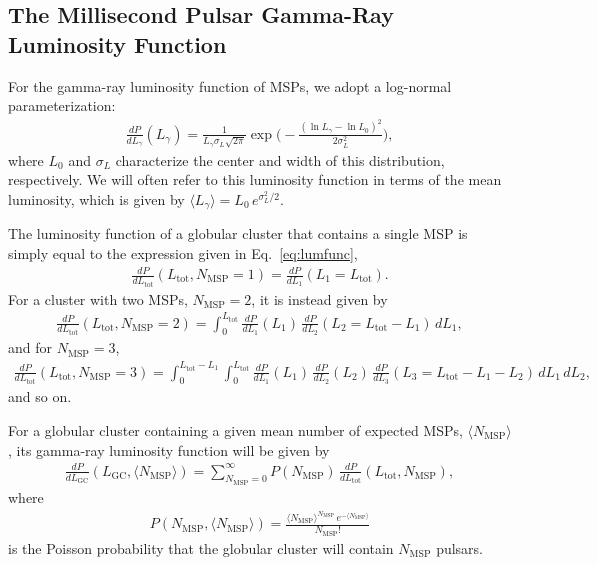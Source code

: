 \subsection{The Millisecond Pulsar Gamma-Ray Luminosity Function}
\label{sec:glf}

For the gamma-ray luminosity function of MSPs, we adopt a log-normal parameterization:
%
\begin{align}
\frac{dP}{dL_{\gamma}}(L_{\gamma}) = \frac{1}{L_{\gamma} \sigma_L \sqrt{2\pi}} \exp\bigg(-\frac{(\ln L_{\gamma} - \ln L_0)^2}{2 \sigma_L^2}\bigg),
\label{eq:lumfunc}
\end{align}
%
where $L_0$ and $\sigma_L$ characterize the center and width of this distribution, respectively. We will often refer to this luminosity function in terms of the mean luminosity, which is given by $\langle L_{\gamma} \rangle = L_0 \, e^{\sigma_L^2/2}$.

The luminosity function of a globular cluster that contains a single MSP is simply equal to the expression given in Eq.~\ref{eq:lumfunc},
%
\begin{align}
\frac{dP}{dL_\textrm{tot}} (L_\textrm{tot}, N_\textrm{MSP}=1) = \frac{dP}{dL_{1}}(L_1=L_\textrm{tot}). 
\end{align}
%
For a cluster with two MSPs, $N_\textrm{MSP}=2$, it is instead given by
%
\begin{align}
\frac{dP}{dL_\textrm{tot}}(L_\textrm{tot}, N_\textrm{MSP}=2) =  \int_0^{L_\textrm{tot}} \frac{dP}{dL_1}(L_1) \, \frac{dP}{dL_2}(L_2=L_\textrm{tot}-L_1) \, dL_1,
\end{align}
%
and for $N_\textrm{MSP}=3$,
%
\begin{align}
\frac{dP}{dL_\textrm{tot}}(L_\textrm{tot}, N_\textrm{MSP}=3)  = \int_0^{L_\textrm{tot}-L_1} \int_0^{L_\textrm{tot}} \frac{dP}{dL_1}(L_1) \, \frac{dP}{dL_2}(L_2) \,\frac{dP}{dL_3}(L_3=L_\textrm{tot}-L_1-L_2) \, dL_1 \, dL_2,
\end{align}
%
and so on.

For a globular cluster containing a given mean number of expected MSPs, $\langle N_\textrm{MSP}\rangle$, its gamma-ray luminosity function will be given by
%
\begin{align}
\frac{dP}{dL_\textrm{GC}}(L_\textrm{GC},\langle N_\textrm{MSP}\rangle)  = \sum_{N_\textrm{MSP}=0}^\infty P(N_\textrm{MSP}) \, \frac{dP}{dL_\textrm{tot}}(L_\textrm{tot}, N_\textrm{MSP}),
\label{eq:glf}
\end{align}
%
where 
%
\begin{align}
P(N_\textrm{MSP},\langle N_\textrm{MSP}\rangle)= \frac{\langle N_\textrm{MSP}\rangle^{N_\textrm{MSP}} \, e^{-\langle N_\textrm{MSP}\rangle}}{N_\textrm{MSP}!}
\end{align}
%
is the Poisson probability that the globular cluster will contain $N_\textrm{MSP}$ pulsars.


